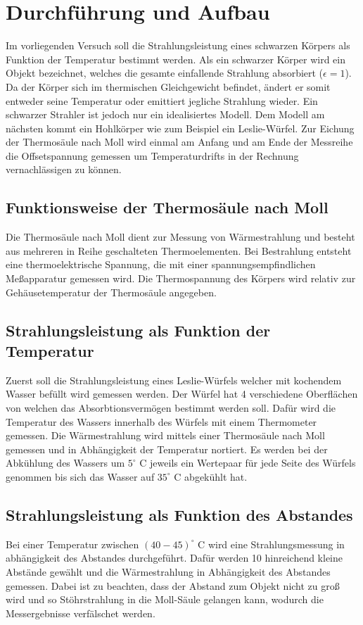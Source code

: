 \section{Durchführung und Aufbau}
\label{sec:Durchführung}
Im vorliegenden Versuch soll die Strahlungsleistung eines schwarzen Körpers als Funktion der Temperatur bestimmt werden. Als ein schwarzer Körper wird ein Objekt bezeichnet, welches die gesamte einfallende Strahlung absorbiert ($\epsilon = 1$). Da der Körper sich im thermischen Gleichgewicht befindet, ändert er somit entweder seine Temperatur oder emittiert jegliche Strahlung wieder. Ein schwarzer Strahler ist jedoch nur ein idealisiertes Modell. Dem Modell am nächsten kommt ein Hohlkörper wie zum Beispiel ein Leslie-Würfel. Zur Eichung der Thermosäule nach Moll wird einmal am Anfang und am Ende der Messreihe die Offsetspannung gemessen um Temperaturdrifts in der Rechnung vernachlässigen zu können.
\subsection{Funktionsweise der Thermosäule nach Moll}
Die Thermosäule nach Moll dient zur Messung von Wärmestrahlung und besteht aus mehreren in Reihe geschalteten Thermoelementen. Bei Bestrahlung entsteht eine thermoelektrische Spannung, die mit einer spannungsempfindlichen Meßapparatur gemessen wird. Die Thermospannung des Körpers wird relativ zur Gehäusetemperatur der Thermosäule angegeben.
\subsection{Strahlungsleistung als Funktion der Temperatur}
Zuerst soll die Strahlungsleistung eines Leslie-Würfels welcher mit kochendem Wasser befüllt wird gemessen werden. Der Würfel hat 4 verschiedene Oberflächen von welchen das Absorbtionsvermögen bestimmt werden soll. Dafür wird die Temperatur des Wassers innerhalb des Würfels mit einem Thermometer gemessen. Die Wärmestrahlung wird mittels einer Thermosäule nach Moll gemessen und in Abhängigkeit der Temperatur nortiert. Es werden bei der Abkühlung des Wassers um $5^\circ$ C jeweils ein Wertepaar für jede Seite des Würfels genommen bis sich das Wasser auf $35^\circ$ C abgekühlt hat.
\subsection{Strahlungsleistung als Funktion des Abstandes}
Bei einer Temperatur zwischen $(40 - 45) ^\circ$ C wird eine Strahlungsmessung in abhängigkeit des Abstandes durchgeführt. Dafür werden 10 hinreichend kleine Abstände gewählt und die Wärmestrahlung in Abhängigkeit des Abstandes gemessen. Dabei ist zu beachten, dass der Abstand zum Objekt nicht zu groß wird und so Stöhrstrahlung in die Moll-Säule gelangen kann, wodurch die Messergebnisse verfälschet werden.
